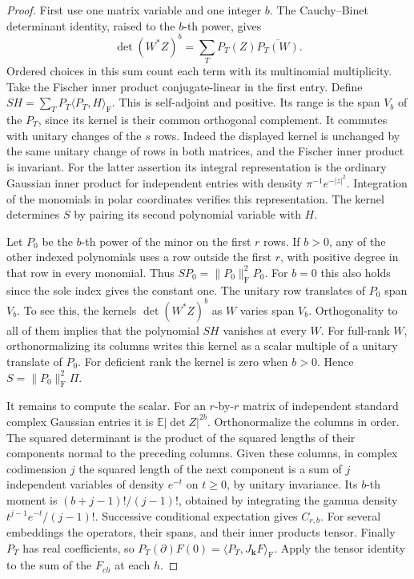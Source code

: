 \documentclass[a4paper,11pt]{article}
\theoremstyle{definition}
\theoremstyle{remark}
\numberwithin{equation}{section}
\begin{document}
\begin{proof}
First use one matrix variable and one integer \(b\). The
Cauchy--Binet determinant identity, raised to the \(b\)-th power,
gives
\[
        \det(W^*Z)^b=\sum_T P_T(Z)\overline{P_T(W)} .
\]
Ordered choices in this sum count each term with its multinomial
multiplicity. Take the Fischer inner product conjugate-linear in the
first entry. Define \(S H=\sum_T P_T\langle P_T,H\rangle_{\mathrm F}\).
This is self-adjoint and positive. Its range is the span \(V_b\)
of the \(P_T\), since its kernel is their common orthogonal complement.
It commutes with unitary changes of the \(s\) rows. Indeed
the displayed kernel is unchanged by the same unitary change of
rows in both matrices, and the Fischer inner product is invariant.
For the latter assertion its integral representation is the ordinary
Gaussian inner product for independent entries with density
\(\pi^{-1}e^{-|z|^2}\). Integration of the monomials in polar
coordinates verifies this representation. The kernel determines
\(S\) by pairing its second polynomial variable with \(H\).

Let \(P_0\) be the \(b\)-th power of the minor on the first \(r\)
rows. If \(b>0\), any of the other indexed polynomials uses a row
outside the first \(r\), with positive degree in that row in every
monomial. Thus \(S P_0=\|P_0\|_{\mathrm F}^2P_0\). For \(b=0\)
this also holds since the sole index gives the constant one.
The unitary row translates of \(P_0\) span \(V_b\). To see this,
the kernels \(\det(W^*Z)^b\) as \(W\) varies span \(V_b\).
Orthogonality to all of them implies that the polynomial \(S H\)
vanishes at every \(W\). For full-rank \(W\), orthonormalizing its
columns writes this kernel as a scalar multiple of a unitary
translate of \(P_0\). For deficient rank the kernel is zero when
\(b>0\). Hence \(S=\|P_0\|_{\mathrm F}^2\Pi\).

It remains to compute the scalar. For an \(r\)-by-\(r\) matrix of
independent standard complex Gaussian entries it is
\(\mathbb E|\det Z|^{2b}\). Orthonormalize the columns in order.
The squared determinant is the product of the squared lengths of
their components normal to the preceding columns. Given these
columns, in complex codimension \(j\) the squared length of the
next component is a sum of \(j\) independent variables of density
\(e^{-t}\) on \(t\ge0\), by unitary invariance. Its \(b\)-th
moment is \((b+j-1)!/(j-1)!\), obtained by integrating the gamma
density \(t^{j-1}e^{-t}/(j-1)!\). Successive conditional expectation
gives \(C_{r,b}\). For several embeddings the operators, their spans,
and their inner products tensor. Finally \(P_T\) has real coefficients,
so \(P_T(\partial)F(0)=\langle P_T,J_{\boldsymbol k}F\rangle_{\mathrm F}\).
Apply the tensor identity to the sum of the \(F_{ch}\) at each \(h\).
\end{proof}
\end{document}
